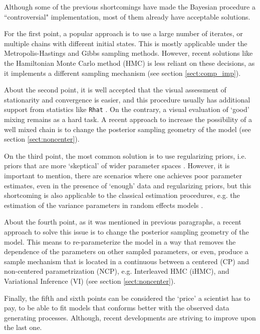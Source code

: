 Although some of the previous shortcomings have made the Bayesian procedure a ``controversial" implementation, most of them already have acceptable solutions. 

For the first point, a popular approach is to use a large number of iterates, or multiple chains with different initial states. This is mostly applicable under the Metropolis-Hastings and Gibbs sampling methods. However, recent solutions like the Hamiltonian Monte Carlo method (HMC) \cite{Betancourt_et_al_2013} is less reliant on these decisions, as it implements a different sampling mechanism (see section \ref{sect:comp_imp}). 

About the second point, it is well accepted that the visual assessment of stationarity and convergence is easier, and this procedure usually has additional support from statistics like \texttt{Rhat} \cite{Gelman_et_al_2014}. On the contrary, a visual evaluation of `good' mixing remains as a hard task. A recent approach to increase the possibility of a well mixed chain is to change the posterior sampling geometry of the model \cite{Papaspiliopoulos_et_al_2003, Papaspiliopoulos_et_al_2007, Betancourt_et_al_2013, McElreath_2020} (see section \ref{sect:noncenter}).

On the third point, the most common solution is to use regularizing priors, i.e. priors that are more `skeptical' of wider parameter spaces \cite{McElreath_2020}. However, it is important to mention, there are scenarios where one achieves poor parameter estimates, even in the presence of `enough' data and regularizing priors, but this shortcoming is also applicable to the classical estimation procedures, e.g. the estimation of the variance parameters in random effects models \cite{Skrondal_et_al_2004a}.

About the fourth point, as it was mentioned in previous paragraphs, a recent approach to solve this issue is to change the posterior sampling geometry of the model. This means to re-parameterize the model in a way that removes the dependence of the parameters on other sampled parameters, or even, produce a sample mechanism that is located in a continuous between a centered (CP) and non-centered parametrization (NCP), e.g. Interleaved HMC (iHMC), and Variational Inference (VI) \cite{Gelfand_et_al_1995, Gelfand_et_al_1996, Papaspiliopoulos_et_al_2003, Papaspiliopoulos_et_al_2007, Betancourt_et_al_2013, Gorinova_et_al_2019} (see section \ref{sect:noncenter}).

Finally, the fifth and sixth points can be considered the `price' a scientist has to pay, to be able to fit models that conforms better with the observed data generating processes. Although, recent developments are striving to improve upon the last one.

